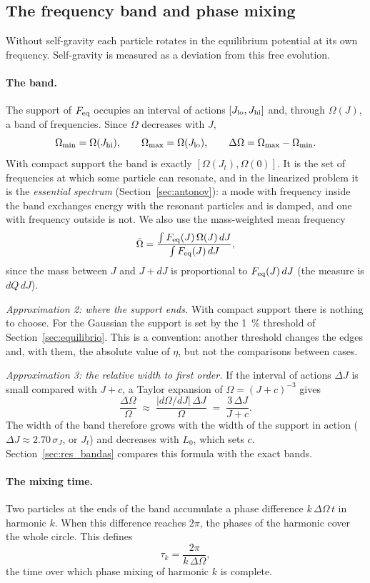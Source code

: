 \documentclass[11pt,a4paper]{article}
\begin{document}
\subsection{The frequency band and phase mixing}
\label{sec:mezcla}
\label{sec:banda}

Without self-gravity each particle rotates in the equilibrium potential at its own
frequency. Self-gravity is measured as a deviation from this free evolution.

\paragraph{The band.} The support of $F_{\rm eq}$ occupies an interval of actions
$[J_{\rm lo},J_{\rm hi}]$ and, through $\Omega(J)$, a band of frequencies. Since $\Omega$
decreases with $J$,
\[
  \Omega_{\min}=\Omega(J_{\rm hi}),\qquad \Omega_{\max}=\Omega(J_{\rm lo}),\qquad
  \Delta\Omega=\Omega_{\max}-\Omega_{\min}.
\]
With compact support the band is exactly $[\Omega(J_t),\Omega(0)]$. It is the set of
frequencies at which some particle can resonate, and in the linearized problem it is
the \emph{essential spectrum} (Section~\ref{sec:antonov}): a mode with frequency inside
the band exchanges energy with the resonant particles and is damped, and one with
frequency outside is not. We also use the mass-weighted mean frequency
\[
  \bar\Omega = \frac{\int F_{\rm eq}(J)\,\Omega(J)\,dJ}{\int F_{\rm eq}(J)\,dJ},
\]
since the mass between $J$ and $J+dJ$ is proportional to $F_{\rm eq}(J)\,dJ$ (the measure is
$dQ\,dJ$).

\emph{Approximation 2: where the support ends.} With compact support there is nothing to
choose. For the Gaussian the support is set by the \SI{1}{\%} threshold of
Section~\ref{sec:equilibrio}. This is a convention: another threshold changes the edges
and, with them, the absolute value of $\eta$, but not the comparisons between cases.

\emph{Approximation 3: the relative width to first order.} If the interval of actions
$\Delta J$ is small compared with $J+c$, a Taylor expansion of $\Omega=(J+c)^{-3}$ gives
\[
  \frac{\Delta\Omega}{\Omega} \;\approx\; \frac{|d\Omega/dJ|\,\Delta J}{\Omega}
  \;=\; \frac{3\,\Delta J}{J+c}.
\]
The width of the band therefore grows with the width of the support in action
($\Delta J\approx2.70\,\sigma_J$, or $J_t$) and decreases with $L_0$, which sets $c$.
Section~\ref{sec:res_bandas} compares this formula with the exact bands.

\paragraph{The mixing time.} Two particles at the ends of the band accumulate a phase
difference $k\,\Delta\Omega\,t$ in harmonic $k$. When this difference reaches $2\pi$, the
phases of the harmonic cover the whole circle. This defines
\[
  \tau_k=\frac{2\pi}{k\,\Delta\Omega},
\]
the time over which phase mixing of harmonic $k$ is complete.
\end{document}
